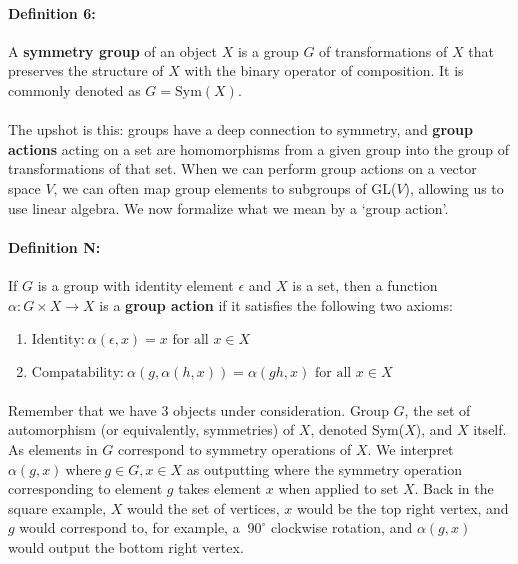 \documentclass[twoside]{article}
\begin{document}
\paragraph*{Definition 6:} A \textbf{symmetry group} of an object $X$ is a
group $G$ of transformations of $X$ that preserves the structure of $X$ with 
the binary operator of composition. It is commonly denoted as $G=\text{Sym}(X)$.

\paragraph*{} The upshot is this: groups have a deep connection to symmetry, and 
\textbf{group actions} acting on a set are homomorphisms from a given group into
the group of transformations of that set. 
When we can perform group actions on a vector space $V$, we 
can often map group elements to subgroups of GL($V$), allowing us to use linear algebra.
We now formalize what we mean by a `group action'.

\paragraph{\textbf{Definition N:}} If $G$ is a group with identity element
$\epsilon$ and $X$ is a set, then a function \\ $\alpha: G \times X  \rightarrow X$
is a \textbf{group action} if it satisfies the following two axioms:
 \begin{enumerate}
  \item $\text{Identity:} \: \alpha(\epsilon, x) = x \text{ for all } x \in X$ 
  \item  $\text{Compatability:} \: \alpha(g, \alpha(h,x)) = \alpha(gh, x) \text{ for all } x \in X$
 \end{enumerate}


\paragraph*{} Remember that we have 3 objects under consideration. Group $G$, the 
set of automorphism (or equivalently, symmetries) of $X$, denoted Sym($X$), and $X$ itself. As 
elements in $G$ correspond to symmetry operations of $X$. We interpret $\alpha(g, x)\: 
\text{where} \: g \in G, x \in X$ as outputting where the symmetry operation 
corresponding to element $g$ takes element $x$ when applied to set $X$. Back in the 
square example, $X$ would the set of vertices, $x$ would be the top right vertex, and 
$g$ would correspond to, for example, a $\ 90^{\circ}$ clockwise rotation, and 
$\alpha(g, x)$ would output the bottom right vertex.
\end{document}
